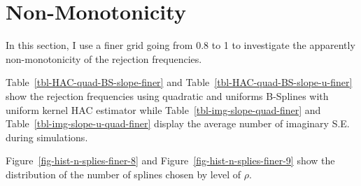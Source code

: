 \documentclass[
]{article}
\begin{document}
\section{Non-Monotonicity}\label{sec-finer}

In this section, I use a finer grid going from 0.8 to 1 to investigate
the apparently non-monotonicity of the rejection frequencies.

Table~\ref{tbl-HAC-quad-BS-slope-finer} and
Table~\ref{tbl-HAC-quad-BS-slope-u-finer} show the rejection frequencies
using quadratic and uniforms B-Splines with uniform kernel HAC estimator
while Table~\ref{tbl-img-slope-quad-finer} and
Table~\ref{tbl-img-slope-u-quad-finer} display the average number of
imaginary S.E. during simulations.

Figure~\ref{fig-hist-n-splies-finer-8} and
Figure~\ref{fig-hist-n-splies-finer-9} show the distribution of the
number of splines chosen by level of \(\rho\).
\end{document}
